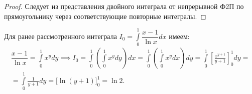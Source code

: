 \documentclass[../../main.tex]{subfiles}
\begin{document}
\begin{proof}
	Следует из представления двойного интеграла от непрерывной Ф2П по
	прямоугольнику через соответствующие повторные интегралы.
\end{proof}
\begin{exmp}
	Для ранее рассмотренного интеграла $I_0 = 
	\displaystyle\int\limits_0^1 \dfrac{x - 1}{\ln x} dx $ имеем:
	\begin{gather*}
	\dfrac{x - 1}{\ln x} = \int\limits_0^1 x^y dy \implies I_0 = 
	\int\limits_0^1 \left(\int\limits_0^1 x^y dy\right)dx = \int\limits_0^1 
	\left(\int\limits_0^1 x^y dx\right)dy = 
	\int\limits_0^1 \left[\frac{x^{y+1}}{y+1}\right]_0^1 dy =  \\
  = \int\limits_0^1 \frac{1}{y+1} dy = \big[\ln(y+1)\big]_0^1 = \ln2.
	\end{gather*}
\end{exmp}
\end{document}
